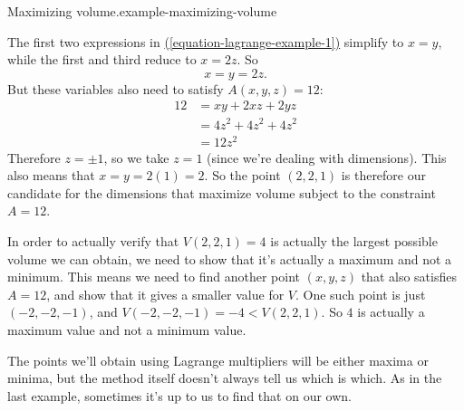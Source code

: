 \documentclass[10pt,]{book}
\numberwithin{equation}{section}
\begin{document}
\begin{example}{Maximizing volume.}{example-maximizing-volume}
%
\par
\hypertarget{p-1445}{}%
The first two expressions in \hyperref[equation-lagrange-example-1]{(\ref{equation-lagrange-example-1})} simplify to \(x=y\), while the first and third reduce to \(x = 2z\). So%
\begin{equation*}
x = y = 2z\text{.}
\end{equation*}
But these variables also need to satisfy \(A(x,y,z) = 12\):%
\begin{align*}
12 & = xy + 2xz + 2yz \\
& = 4z^{2} + 4z^{2} + 4z^{2} \\
& = 12z^{2} 
\end{align*}
Therefore \(z = \pm1\), so we take \(z=1\) (since we're dealing with dimensions). This also means that \(x = y = 2(1) = 2\). So the point \((2,2,1)\) is therefore our candidate for the dimensions that maximize volume subject to the constraint \(A = 12\).%
\par
\hypertarget{p-1446}{}%
In order to actually verify that \(V(2,2,1) = 4\) is actually the largest possible volume we can obtain, we need to show that it's actually a maximum and not a minimum. This means we need to find another point \((x,y,z)\) that also satisfies \(A = 12\), and show that it gives a smaller value for \(V\). One such point is just \((-2,-2,-1)\), and \(V(-2,-2,-1) = -4 < V(2,2,1)\). So \(4\) is actually a maximum value and not a minimum value.%
\end{example}
\hypertarget{p-1447}{}%
The points we'll obtain using Lagrange multipliers will be either maxima or minima, but the method itself doesn't always tell us which is which. As in the last example, sometimes it's up to us to find that on our own.%
\end{document}
